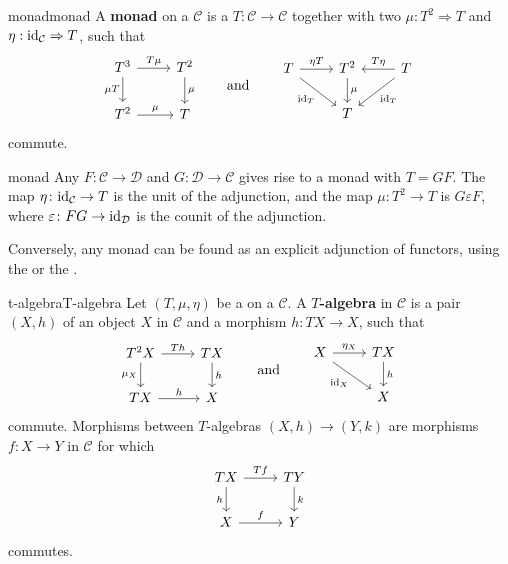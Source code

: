\begin{topic}{monad}{monad}
    A \textbf{monad} on a  $\mathcal{C}$ is a  $T \colon \mathcal{C} \to \mathcal{C}$ together with two  $\mu : T^2 \Rightarrow T$ and $\eta : \textup{id}_{\mathcal{C}} \Rightarrow T$, such that
    \[ \svg \begin{tikzcd} T^3 \arrow{r}{T \mu} \arrow[swap]{d}{\mu T} & T^2 \arrow{d}{\mu} \\ T^2 \arrow{r}{\mu} & T \end{tikzcd} \qquad \text{and} \qquad \begin{tikzcd} T \arrow{r}{\eta T} \arrow[swap]{dr}{\id_T} & T^2 \arrow{d}{\mu} & \arrow[swap]{l}{T \eta} T \arrow{ld}{\id_T} \\ & T & \end{tikzcd} \]
    commute.
\end{topic}

\begin{example}{monad}
    Any  $F \colon \mathcal{C} \to \mathcal{D}$ and $G \colon \mathcal{D} \to \mathcal{C}$ gives rise to a monad with $T = GF$. The map $\eta \colon \textup{id}_{\mathcal{C}} \to T$ is the unit of the adjunction, and the map $\mu \colon T^2 \to T$ is $G \varepsilon F$, where $\varepsilon \colon FG \to \textup{id}_{\mathcal{D}}$ is the counit of the adjunction.
    
    Conversely, any monad can be found as an explicit adjunction of functors, using the  or the .
\end{example}

\begin{topic}{t-algebra}{T-algebra}
    Let $(T, \mu, \eta)$ be a  on a  $\mathcal{C}$. A \textbf{$T$-algebra} in $\mathcal{C}$ is a pair $(X, h)$ of an object $X$ in $\mathcal{C}$ and a morphism $h \colon TX \to X$, such that
    \[ \svg \begin{tikzcd} T^2 X \arrow[swap]{d}{\mu_X} \arrow{r}{Th} & TX \arrow{d}{h} \\ TX \arrow{r}{h} & X \end{tikzcd} \qquad \text{and} \qquad \begin{tikzcd} X \arrow[swap]{dr}{\id_X} \arrow{r}{\eta_X} & TX \arrow{d}{h} \\ & X \end{tikzcd} \]
    commute. Morphisms between $T$-algebras $(X, h) \to (Y, k)$ are morphisms $f \colon X \to Y$ in $\mathcal{C}$ for which
    \[ \svg \begin{tikzcd} TX \arrow{r}{Tf} \arrow[swap]{d}{h} & TY \arrow{d}{k} \\ X \arrow{r}{f} & Y \end{tikzcd} \]
    commutes.
\end{topic}

